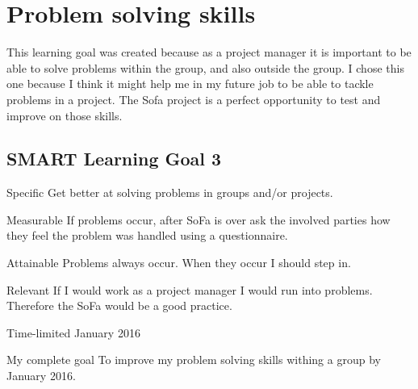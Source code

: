\documentclass[12pt]{article}
\begin{document}
	\section{Problem solving skills}
	This learning goal was created because as a project manager it is important to be able to solve problems within the group, and also outside the group. I chose this one because I think it might help me in my future job to be able to tackle problems in a project. The Sofa project is a perfect opportunity to test and improve on those skills.
	
	\subsection{SMART Learning Goal 3}
	\begin{SMART}
	    \item[Specific] Get better at solving problems in groups and/or projects.
	    \item[Measurable] If problems occur, after SoFa is over ask the involved parties how they feel the problem was handled using a questionnaire.
	    \item[Attainable]  Problems always occur. When they occur I should step in.
	    \item[Relevant] If I would work as a project manager I would run into problems. Therefore the SoFa would be a good practice.
	    \item[Time-limited] January 2016
	    \item[My complete goal] To improve my problem solving skills withing a group by January 2016.
	\end{SMART}
	
\end{document}
